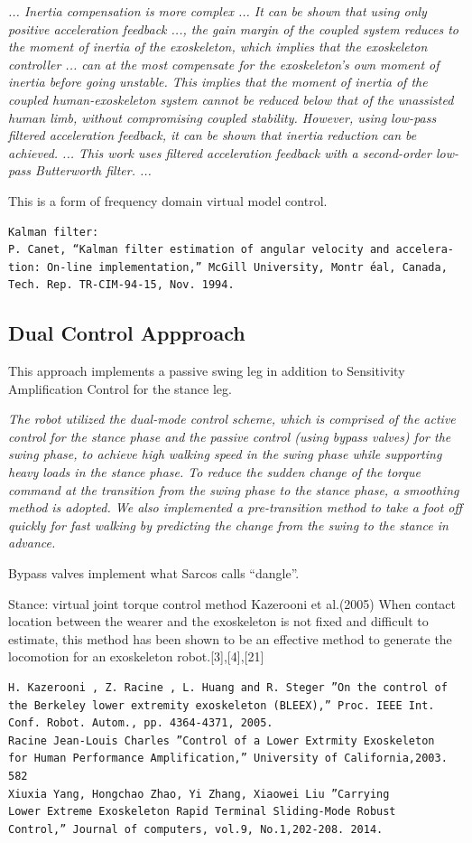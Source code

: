 \documentclass[letterpaper,12pt,fullpage]{article}
\begin{document}
{\it
... Inertia compensation is more complex ...
It can be shown that using only positive acceleration
feedback ..., the gain margin of the coupled system
reduces to the moment of inertia of the exoskeleton, which
implies that the exoskeleton controller ... can at the most
compensate for the exoskeleton’s own moment of inertia
before going unstable. This implies that the moment of
inertia of the coupled human-exoskeleton system cannot be
reduced below that of the unassisted human limb, without
compromising coupled stability. However, using low-pass
filtered acceleration feedback, it can be shown that inertia 
reduction can be achieved. ...
This work uses filtered acceleration
feedback with a second-order low-pass Butterworth filter. ...
}~\cite{Nagarajan_etal_2015}

This is a form of frequency domain virtual model control.

\begin{verbatim}
Kalman filter:
P. Canet, “Kalman filter estimation of angular velocity and accelera-
tion: On-line implementation,” McGill University, Montr ́eal, Canada,
Tech. Rep. TR-CIM-94-15, Nov. 1994.
\end{verbatim}

\subsection{Dual Control Appproach}

This approach implements a passive swing leg in addition to Sensitivity 
Amplification Control for the stance leg.

{\it The robot utilized the dual-mode control scheme, which is
comprised of the active control for the stance phase and the
passive control (using bypass valves) for the swing phase, to achieve high walking
speed in the swing phase while supporting heavy loads in
the stance phase. To reduce the sudden change of the torque
command at the transition from the swing phase to the stance
phase, a smoothing method is adopted. We also implemented
a pre-transition method to take a foot off quickly for fast
walking by predicting the change from the swing to the stance
in advance.}~\cite{IEEE07222598}

Bypass valves implement what Sarcos calls ``dangle''.

Stance: virtual joint torque control method Kazerooni et al.(2005)
When contact location between the wearer and the
exoskeleton is not fixed and difficult to estimate, this method
has been shown to be an effective method to generate the
locomotion for an exoskeleton robot.[3],[4],[21]
\begin{verbatim}
H. Kazerooni , Z. Racine , L. Huang and R. Steger ”On the control of
the Berkeley lower extremity exoskeleton (BLEEX),” Proc. IEEE Int.
Conf. Robot. Autom., pp. 4364-4371, 2005.
Racine Jean-Louis Charles ”Control of a Lower Extrmity Exoskeleton
for Human Performance Amplification,” University of California,2003.
582
Xiuxia Yang, Hongchao Zhao, Yi Zhang, Xiaowei Liu ”Carrying
Lower Extreme Exoskeleton Rapid Terminal Sliding-Mode Robust
Control,” Journal of computers, vol.9, No.1,202-208. 2014.
\end{verbatim}
\end{document}
